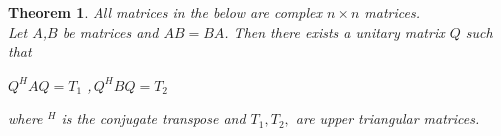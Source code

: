\documentclass[12pt]{article}
\newtheorem{thm}{Theorem}
\begin{document}
\begin{thm}
All matrices in the below are complex $n\times n$ matrices.
\\Let $A$,$B$ be matrices and $AB=BA$. Then there exists a unitary matrix $Q$ such that \\
\begin{center}
$Q^HAQ = T_1$ ,\,$Q^HBQ=T_2$
\end{center}
where $^H$ is the conjugate transpose and $T_1, T_2,$ are upper triangular matrices.
\end{thm}
\end{document}
